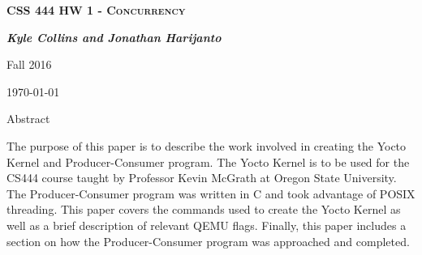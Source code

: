 \documentclass[letterpaper,10pt,draftclsnofoot,titlepage,onecolumn]{IEEEtran}
\begin{document}
	
	\begin{titlepage}
		\centering
		{\scshape\LARGE \textbf{CSS 444 HW 1 - Concurrency}\par}
		{\LARGE\itshape \textbf{Kyle Collins and Jonathan Harijanto}\par}
		{\LARGE Fall 2016\par}
		{\LARGE \today\par}
		
		{\LARGE Abstract\par}
		The purpose of this paper is to describe the work involved in creating the Yocto Kernel and Producer-Consumer program. The Yocto Kernel is to be used for the
		CS444 course taught by Professor Kevin McGrath at Oregon State University. The Producer-Consumer program was written in C and took advantage of POSIX threading.
		This paper covers the commands used to create the Yocto Kernel as well as a brief description of relevant QEMU flags. Finally, this paper includes a section on
		how the Producer-Consumer program was approached and completed. 
		
	\end{titlepage}
	
	\clearpage
	\tableofcontents
	\clearpage
\end{document}
